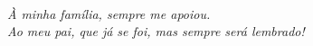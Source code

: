 


\thispagestyle{plain}

\

\vfill

\begin{flushright}
\hfill \textit{À minha família, sempre me apoiou. \\
Ao meu pai, que já se foi, mas sempre será lembrado! }
\end{flushright}

\vspace*{1cm}

\clearpage
